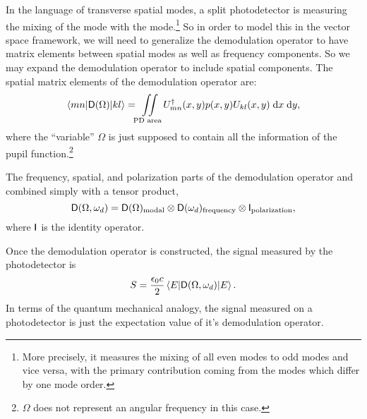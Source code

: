 
In the language of transverse spatial modes, a split photodetector is measuring the mixing of the  mode with the  mode.\footnote{More precisely, it measures the mixing of all even modes to odd modes and vice versa, with the primary contribution coming from the modes which differ by one mode order.} So in order to model this in the vector space framework, we will need to generalize the demodulation operator to have matrix elements between spatial modes as well as frequency components. %
So we may expand the demodulation operator to include spatial components. %
The spatial matrix elements of the demodulation operator are:
\begin{equation}
\label{eqn:spacedemod}
\matrixel{mn}{\oper{D}(\Omega)}{kl}=\iint\limits_{\text{PD area}}U_{mn}^\dagger(x,y)p(x,y)U_{kl}(x,y)\dd x \dd y,
\end{equation}
where the ``variable'' %
$\Omega$ is just supposed to contain all the information of the pupil function.\footnote{$\Omega$ does not represent an angular frequency in this case.}

The frequency, spatial, and polarization parts of the demodulation operator and combined simply with a tensor product,
\begin{equation}
\mathsf{D}(\Omega,\omega_d) = \mathsf{D}(\Omega)_{\text{modal}}\otimes\mathsf{D}(\omega_d)_{\text{frequency}}\otimes\mathsf{I}_{\text{polarization}},
\end{equation}
where $\mathsf{I}$ is the identity operator.

Once the demodulation operator is constructed, the signal measured by the photodetector is
\begin{equation}
S=\frac{\epsilon_0 c}{2}\matrixel{E}{\oper{D}(\Omega,\omega_d)}{E}.
\end{equation}
In terms of the quantum mechanical analogy, the signal measured on a photodetector is just the expectation value of it's demodulation operator.

